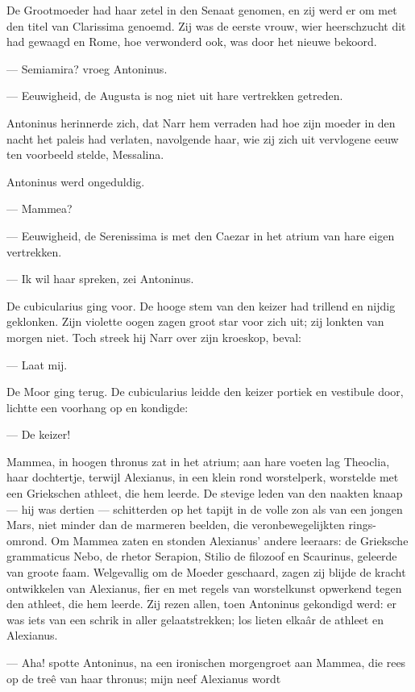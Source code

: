 \documentclass[a4paper, 12pt, oneside, dutch]{article}
\begin{document}
De Grootmoeder had haar zetel in den Senaat genomen, en zij werd er om met den titel van Clarissima genoemd. Zij was de eerste vrouw, wier heerschzucht dit had gewaagd en Rome, hoe verwonderd ook, was door het nieuwe bekoord.

--- Semiamira? vroeg Antoninus.

--- Eeuwigheid, de Augusta is nog niet uit hare vertrekken getreden.

Antoninus herinnerde zich, dat Narr hem verraden had hoe zijn moeder in den nacht het paleis had verlaten, navolgende haar, wie zij zich uit vervlogene eeuw ten voorbeeld stelde, Messalina.

Antoninus werd ongeduldig.

--- Mammea?

--- Eeuwigheid, de Serenissima is met den Caezar in het atrium van hare eigen vertrekken.

--- Ik wil haar spreken, zei Antoninus.

De cubicularius ging voor. De hooge stem van den keizer had trillend en nijdig geklonken. Zijn violette oogen zagen groot star voor zich uit; zij lonkten van morgen niet. Toch streek hij Narr over zijn kroeskop, beval:

--- Laat mij.

De Moor ging terug. De cubicularius leidde den keizer portiek en vestibule door, lichtte een voorhang op en kondigde:

--- De keizer!

Mammea, in hoogen thronus zat in het atrium; aan hare voeten lag Theoclia, haar dochtertje, terwijl Alexianus, in een klein rond worstelperk, worstelde met een Griekschen athleet, die hem leerde. De stevige leden van den naakten knaap --- hij was dertien --- schitterden op het tapijt in de volle zon als van een jongen Mars, niet minder dan de marmeren beelden, die veronbewegelijkten rings-omrond. Om Mammea zaten en stonden Alexianus' andere leeraars: de Grieksche grammaticus Nebo, de rhetor Serapion, Stilio de filozoof en Scaurinus, geleerde van groote faam. Welgevallig om de Moeder geschaard, zagen zij blijde de kracht ontwikkelen van Alexianus, fier en met regels van worstelkunst opwerkend tegen den athleet, die hem leerde. Zij rezen allen, toen Antoninus gekondigd werd: er was iets van een schrik in aller gelaatstrekken; los lieten elkaâr de athleet en Alexianus.

--- Aha! spotte Antoninus, na een ironischen morgengroet aan Mammea, die rees op de treê van haar thronus; mijn neef Alexianus wordt
\end{document}
